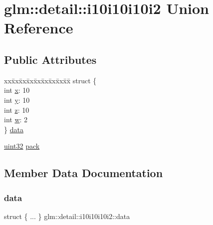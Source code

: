 \hypertarget{unionglm_1_1detail_1_1i10i10i10i2}{}\section{glm\+:\+:detail\+:\+:i10i10i10i2 Union Reference}
\label{unionglm_1_1detail_1_1i10i10i10i2}
\subsection*{Public Attributes}
\begin{DoxyCompactItemize}
\item 
\begin{tabbing}
xx\=xx\=xx\=xx\=xx\=xx\=xx\=xx\=xx\=\kill
struct \{\\
\>int \hyperlink{unionglm_1_1detail_1_1i10i10i10i2_a290d519ee2feaba6ae4b5244d5d90e7b}{x}: 10\\
\>int \hyperlink{unionglm_1_1detail_1_1i10i10i10i2_ae76bb89adeb66d1ee5bb2b265e87fc1b}{y}: 10\\
\>int \hyperlink{unionglm_1_1detail_1_1i10i10i10i2_a95398090414de32eaaf9cb3c3bd3fa48}{z}: 10\\
\>int \hyperlink{unionglm_1_1detail_1_1i10i10i10i2_a20c12acbdb874a476b158164acd17abd}{w}: 2\\
\} \hyperlink{unionglm_1_1detail_1_1i10i10i10i2_a425fea084366cd3c538f626e29cd63e0}{data}\\

\end{tabbing}\item 
\hyperlink{namespaceglm_1_1detail_ade6cfbf377022aaa391af8cd50489222}{uint32} \hyperlink{unionglm_1_1detail_1_1i10i10i10i2_a24e2dc324c86589d568dc330904c859a}{pack}
\end{DoxyCompactItemize}


\subsection{Member Data Documentation}
\mbox{\label{unionglm_1_1detail_1_1i10i10i10i2_a425fea084366cd3c538f626e29cd63e0}} 
\subsubsection{\texorpdfstring{data}{data}}
{\footnotesize\ttfamily struct \{ ... \}   glm\+::detail\+::i10i10i10i2\+::data}

